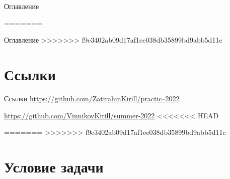 \documentclass[12pt]{beamer}
\begin{document}
\begin{frame}{Оглавление}
    \tableofcontents
    
    
=======
\maketitle

\begin{frame}{Оглавление}
    \tableofcontents
>>>>>>> f9e3402ab09d17af1ee038db35899bd9abb5d11c
\end{frame}

\section{Ссылки}

\begin{frame}{Ссылки}
     \href{https://github.com/ZatirahinKirill/practic--2022}{https://github.com/ZatirahinKirill/practic--2022}

     \href{https://github.com/VinnikovKirill/summer-2022}{https://github.com/VinnikovKirill/summer-2022}
<<<<<<< HEAD
     
    
=======
>>>>>>> f9e3402ab09d17af1ee038db35899bd9abb5d11c
\end{frame}

\section{Условие задачи}


\end{frame}
\end{document}
